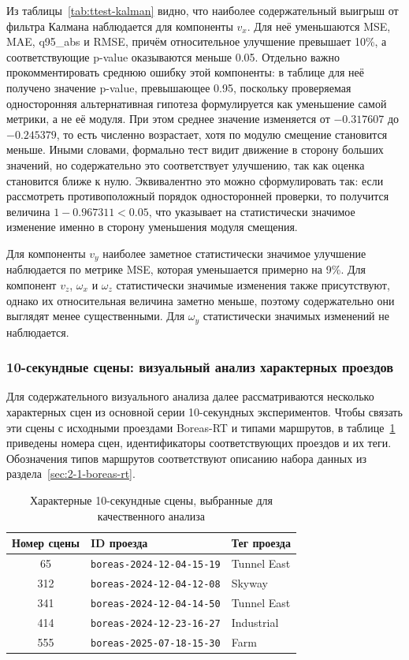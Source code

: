Из таблицы~\ref{tab:ttest-kalman} видно, что наиболее содержательный выигрыш от фильтра Калмана наблюдается для компоненты \(v_x\). Для неё уменьшаются MSE, MAE, q95\_abs и RMSE, причём относительное улучшение превышает 10\%, а соответствующие p-value оказываются меньше 0.05. Отдельно важно прокомментировать среднюю ошибку этой компоненты: в таблице для неё получено значение p-value, превышающее 0.95, поскольку проверяемая односторонняя альтернативная гипотеза формулируется как уменьшение самой метрики, а не её модуля. При этом среднее значение изменяется от \(-0.317607\) до \(-0.245379\), то есть численно возрастает, хотя по модулю смещение становится меньше. Иными словами, формально тест видит движение в сторону больших значений, но содержательно это соответствует улучшению, так как оценка становится ближе к нулю. Эквивалентно это можно сформулировать так: если рассмотреть противоположный порядок односторонней проверки, то получится величина \(1 - 0.967311 < 0.05\), что указывает на статистически значимое изменение именно в сторону уменьшения модуля смещения.

Для компоненты \(v_y\) наиболее заметное статистически значимое улучшение наблюдается по метрике MSE, которая уменьшается примерно на 9\%. Для компонент \(v_z\), \(\omega_x\) и \(\omega_z\) статистически значимые изменения также присутствуют, однако их относительная величина заметно меньше, поэтому содержательно они выглядят менее существенными. Для \(\omega_y\) статистически значимых изменений не наблюдается.

\subsubsection{10-секундные сцены: визуальный анализ характерных проездов}

Для содержательного визуального анализа далее рассматриваются несколько характерных сцен из основной серии 10-секундных экспериментов. Чтобы связать эти сцены с исходными проездами Boreas-RT и типами маршрутов, в таблице~\ref{tab:selected-scenes} приведены номера сцен, идентификаторы соответствующих проездов и их теги. Обозначения типов маршрутов соответствуют описанию набора данных из раздела~\ref{sec:2-1-boreas-rt}.

\begin{table}
\centering
\caption{Характерные 10-секундные сцены, выбранные для качественного анализа}
\label{tab:selected-scenes}
\begin{tabular}{|c|l|l|}
\hline
Номер сцены & ID проезда & Тег проезда \\
\hline
65 & \texttt{boreas-2024-12-04-15-19} & Tunnel East \\
\hline
312 & \texttt{boreas-2024-12-04-12-08} & Skyway \\
\hline
341 & \texttt{boreas-2024-12-04-14-50} & Tunnel East \\
\hline
414 & \texttt{boreas-2024-12-23-16-27} & Industrial \\
\hline
555 & \texttt{boreas-2025-07-18-15-30} & Farm \\
\hline
\end{tabular}
\end{table}

